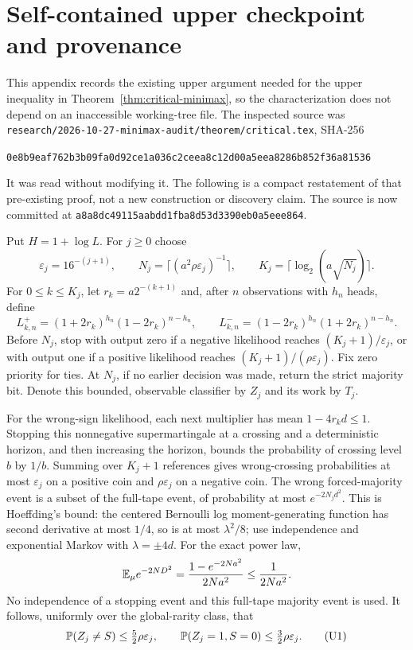 \section{Self-contained upper checkpoint and provenance}
This appendix records the existing upper argument needed for the upper
inequality in Theorem~\ref{thm:critical-minimax}, so the characterization does not depend on an inaccessible
working-tree file. The inspected source was
\texttt{research/2026-10-27-minimax-audit/theorem/critical.tex}, SHA-256
\begin{center}\small\texttt{0e8b9eaf762b3b09fa0d92ce1a036c2ceea8c12d00a5eea8286b852f36a81536}\end{center}
It was read without modifying it. The following is a compact restatement of
that pre-existing proof, not a new construction or discovery claim.
The source is now committed at
\texttt{a8a8dc49115aabdd1fba8d53d3390eb0a5eee864}.

Put $H=1+\log L$. For $j\ge0$ choose
\[
 \varepsilon_j=16^{-(j+1)},\qquad
 N_j=\lceil(a^2\rho\varepsilon_j)^{-1}\rceil,\qquad
 K_j=\lceil\log_2(a\sqrt{N_j})\rceil.
\]
For $0\le k\le K_j$, let $r_k=a2^{-(k+1)}$ and, after $n$ observations
with $h_n$ heads, define
\[
 L^+_{k,n}=(1+2r_k)^{h_n}(1-2r_k)^{n-h_n},\qquad
 L^-_{k,n}=(1-2r_k)^{h_n}(1+2r_k)^{n-h_n}.
\]
Before $N_j$, stop with output zero if a negative likelihood reaches
$(K_j+1)/\varepsilon_j$, or with output one if a positive likelihood reaches
$(K_j+1)/(\rho\varepsilon_j)$. Fix zero priority for ties. At $N_j$, if no
earlier decision was made, return the strict majority bit. Denote this bounded,
observable classifier by $Z_j$ and its work by $T_j$.

For the wrong-sign likelihood, each next multiplier has mean $1-4r_kd\le1$.
Stopping this nonnegative supermartingale at a crossing and a deterministic
horizon, and then increasing the horizon, bounds the probability of crossing
level $b$ by $1/b$. Summing over $K_j+1$ references gives wrong-crossing
probabilities at most $\varepsilon_j$ on a positive coin and
$\rho\varepsilon_j$ on a negative coin. The wrong forced-majority event is
a subset of the full-tape event, of probability at most $e^{-2N_jd^2}$.
This is Hoeffding's bound: the centered Bernoulli log moment-generating
function has second derivative at most $1/4$, so is at most $\lambda^2/8$;
use independence and exponential Markov with $\lambda=\pm4d$.
For the exact power law,
\[
 \mathbb E_\mu e^{-2ND^2}=\frac{1-e^{-2Na^2}}{2Na^2}\le\frac1{2Na^2}.
\]
No independence of a stopping event and this full-tape majority event is used.
It follows, uniformly over the global-rarity class, that
\[
 \mathbb P(Z_j\ne S)\le\tfrac52\rho\varepsilon_j,
 \qquad \mathbb P(Z_j=1,S=0)\le\tfrac32\rho\varepsilon_j.       \tag{U1}
\]

